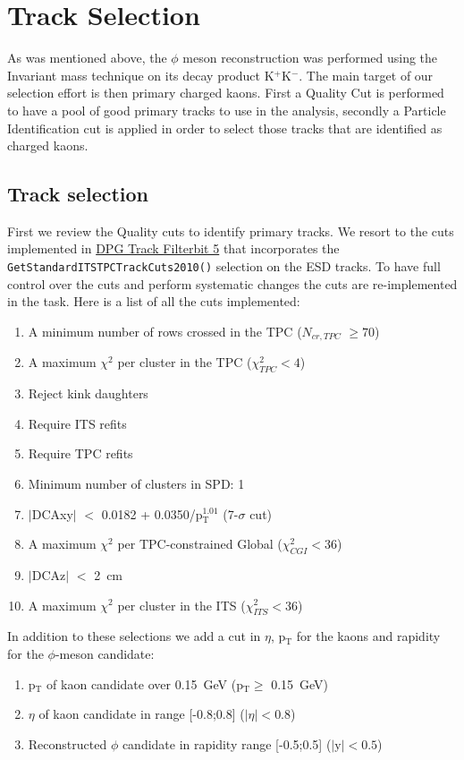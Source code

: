 \section{Track Selection}
\label{sec:Trackselection}

As was mentioned above, the $\phi$ meson reconstruction was performed using the Invariant mass technique on its decay product K$^{+}$K$^{-}$. The main target of our selection effort is then primary charged kaons. First a Quality Cut is performed to have a pool of good primary tracks to use in the analysis, secondly a Particle Identification cut is applied in order to select those tracks that are identified as charged kaons.
\subsection{Track selection}
First we review the Quality cuts to identify primary tracks. We resort to the cuts implemented in \href{https://twiki.cern.ch/twiki/bin/viewauth/ALICE/AliDPGtoolsFilteringCuts#Run_flag_1000_AddTrackCutsLHC10b}{DPG Track Filterbit 5} that incorporates the \texttt{GetStandardITSTPCTrackCuts2010()} selection on the ESD tracks. To have full control over the cuts and perform systematic changes the cuts are re-implemented in the task. Here is a list of all the cuts implemented:
\begin{enumerate}
\item A minimum number of rows crossed in the TPC ($N_{cr,TPC}$ $\geq 70$)
\item A maximum $\chi^2$ per cluster in the TPC ($\chi^2_{TPC} < 4$)
\item Reject kink daughters
\item Require ITS refits
\item Require TPC refits
\item Minimum number of clusters in SPD: 1
\item $|$DCAxy$|$ $<$ 0.0182 + 0.0350/p$_{\text{T}}^{1.01}$ (7-$\sigma$ cut)
\item A maximum $\chi^2$ per TPC-constrained Global ($\chi^2_{CGI} < 36$)
\item $|$DCAz$|$ $<$ \SI{2}{\centi \meter}
\item A maximum $\chi^2$ per cluster in the ITS ($\chi^2_{ITS} < 36$)
\end{enumerate}
In addition to these selections we add a cut in $\eta$, p$_{\text{T}}$ for the kaons and rapidity for the $\phi$-meson candidate:
\begin{enumerate}
\item p$_{\text{T}}$ of kaon candidate over \SI{0.15}{\giga\electronvolt} (p$_{\text{T}} \geq$ \SI{0.15}{\giga\electronvolt})
\item $\eta$ of kaon candidate in range [-0.8;0.8] ($|\eta| < 0.8$)
\item Reconstructed $\phi$ candidate in rapidity range [-0.5;0.5] ($|\text{y}| < 0.5$)
\end{enumerate}
